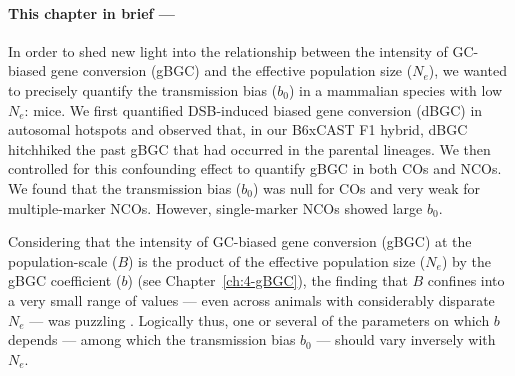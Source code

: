 {\small{} \itshape{}

\paragraph{This chapter in brief —}

In order to shed new light into the relationship between the intensity of GC-biased gene conversion (gBGC) and the effective population size ($N_e$), we wanted to precisely quantify the transmission bias ($b_0$) in a mammalian species with low $N_e$: mice.
We first quantified DSB-induced biased gene conversion (dBGC) in autosomal hotspots and observed that, in our B6xCAST F1 hybrid, dBGC hitchhiked the past gBGC that had occurred in the parental lineages.
We then controlled for this confounding effect to quantify gBGC in both COs and NCOs.
We found that the transmission bias ($b_0$) was null for COs and very weak for multiple-marker NCOs. 
However, single-marker NCOs showed large $b_0$.



}

\newpage

Considering that the intensity of GC-biased gene conversion (gBGC) at the population-scale ($B$) is the product of the effective population size ($N_e$) by the gBGC coefficient ($b$) (see Chapter~\ref{ch:4-gBGC}), the finding that $B$ confines into a very small range of values — even across animals with considerably disparate $N_e$ — was puzzling \citep{galtier2018codon}.
Logically thus, one or several of the parameters on which $b$ depends — among which the transmission bias $b_0$ — should vary inversely with $N_e$.

